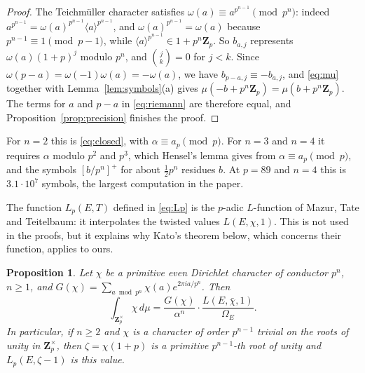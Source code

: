 \documentclass[11pt]{amsart}
\newtheorem{proposition}[theorem]{Proposition}
\theoremstyle{definition}
\newcommand{\Zp}{\mathbf{Z}_p}
\begin{document}
\begin{proof}
The Teichm\"uller character satisfies $\omega(a)\equiv a^{p^{n-1}}\pmod{p^n}$: indeed $a^{p^{n-1}}=\omega(a)^{p^{n-1}}\langle a\rangle^{p^{n-1}}$, and $\omega(a)^{p^{n-1}}=\omega(a)$ because $p^{n-1}\equiv1\pmod{p-1}$, while $\langle a\rangle^{p^{n-1}}\in1+p^n\Zp$. So $b_{a,j}$ represents $\omega(a)(1+p)^j$ modulo $p^n$, and $\binom{j}{k}=0$ for $j<k$. Since $\omega(p-a)=\omega(-1)\omega(a)=-\omega(a)$, we have $b_{p-a,j}\equiv-b_{a,j}$, and \eqref{eq:mu} together with Lemma~\ref{lem:symbols}(a) gives $\mu(-b+p^n\Zp)=\mu(b+p^n\Zp)$. The terms for $a$ and $p-a$ in \eqref{eq:riemann} are therefore equal, and Proposition~\ref{prop:precision} finishes the proof.
\end{proof}

For $n=2$ this is \eqref{eq:closed}, with $\alpha\equiv a_p\pmod p$. For $n=3$ and $n=4$ it requires $\alpha$ modulo $p^2$ and $p^3$, which Hensel's lemma gives from $\alpha\equiv a_p\pmod p$, and the symbols $[b/p^n]^+$ for about $\frac12p^{n}$ residues $b$. At $p=89$ and $n=4$ this is $3.1\cdot10^7$ symbols, the largest computation in the paper.

The function $L_p(E,T)$ defined in \eqref{eq:Lp} is the $p$-adic $L$-function of Mazur, Tate and Teitelbaum: it interpolates the twisted values $L(E,\chi,1)$. This is not used in the proofs, but it explains why Kato's theorem below, which concerns their function, applies to ours.

\begin{proposition}\label{prop:interp}
Let $\chi$ be a primitive even Dirichlet character of conductor $p^n$, $n\ge1$, and $G(\chi)=\sum_{a\bmod p^n}\chi(a)e^{2\pi ia/p^n}$. Then
\[
\int_{\Zp^\times}\chi\,d\mu=\frac{G(\chi)}{\alpha^{n}}\cdot\frac{L(E,\bar\chi,1)}{\Omega_E}.
\]
In particular, if $n\ge2$ and $\chi$ is a character of order $p^{n-1}$ trivial on the roots of unity in $\Zp^\times$, then $\zeta=\chi(1+p)$ is a primitive $p^{n-1}$-th root of unity and $L_p(E,\zeta-1)$ is this value.
\end{proposition}
\end{document}
